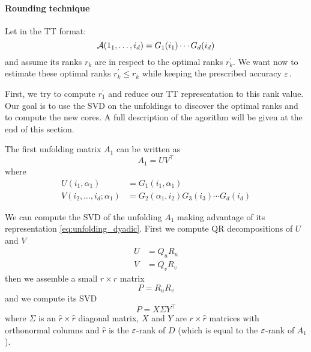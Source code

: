 \paragraph{Rounding technique}
Let \A in the TT format:
\begin{equation*}
  \mathcal{A}(1_1,\ldots,i_d) = G_1(i_1) \cdots G_d(i_d)
\end{equation*}
and assume its ranks $r_k$ are  in respect to the optimal ranks $r_k^\prime$. We want now to estimate these optimal ranks $r_k^\prime \le r_k$ while keeping the prescribed accuracy $\varepsilon$.

First, we try to compute $r_1^\prime$ and reduce our TT representation to this rank value. Our goal is to use the SVD on the unfoldings to discover the optimal ranks and to compute the new  cores. A full description of the agorithm will be given at the end of this section.

The first unfolding matrix $A_1$ can be written as
\begin{equation} \label{eq:unfolding_dyadic}
  A_1 = UV^\top
\end{equation}
where
\begin{equation} \label{def:UV}
  \begin{split}
    U(i_1,\alpha_1) &= G_1(i_1,\alpha_1)\\
    V(i_2,\ldots,i_d;\alpha_1) &= G_2(\alpha_1,i_2) G_3(i_3) \cdots G_d(i_d)
  \end{split}
\end{equation}

We can compute the SVD of the unfolding $A_1$ making advantage of its representation \ref{eq:unfolding_dyadic}. First we compute QR decompositions of $U$ and $V$
\begin{equation*}
  \begin{split}
    U &= Q_u R_u\\
    V &= Q_v R_v
  \end{split}
\end{equation*}
then we assemble a small $r \times r$ matrix
\begin{equation*}
  P = R_u R_v
\end{equation*}
and we compute its SVD
\begin{equation*}
  P = X \Sigma Y^\top
\end{equation*}
where $\Sigma$ is an $\hat{r}\times\hat{r}$ diagonal matrix, $X$ and $Y$ are $r \times \hat{r}$ matrices with orthonormal columns and $\hat{r}$ is the $\varepsilon$-rank of $D$ (which is equal to the $\varepsilon$-rank of $A_1$).


